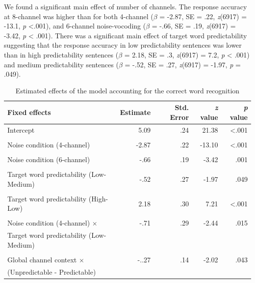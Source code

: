 \documentclass[a4paper, nobind]{templates/ociamthesis}
\begin{document}
We found a significant main effect of number of channels.
The response accuracy at 8-channel was higher than for both 4-channel
(\(\beta\) = -2.87, SE = .22, \emph{z}(6917) = -13.1, \emph{p} \textless.001),
and 6-channel noise-vocoding (\(\beta\) = -.66, SE = .19, \emph{z}(6917) = -3.42, \emph{p} \textless{} .001).
There was a significant main effect of target word predictability suggesting that
the response accuracy in low predictability sentences was lower than in high predictability sentences
(\(\beta\) = 2.18, SE = .3, \emph{z}(6917) = 7.2, \emph{p} \textless{} .001) and medium predictability sentences
(\(\beta\) = -.52, SE = .27, \emph{z}(6917) = -1.97, \emph{p} = .049).

\begin{table}[ht]
\begin{center}
\caption{Estimated effects of the model accounting for the correct word recognition}
\label{results2} 
\vskip 0.12in
\begin{tabular}[]{@{}lrrrr@{}}
\toprule
Fixed effects & Estimate & Std. Error & \emph{z} value & \emph{p}
value \\
\midrule
Intercept & 5.09 & .24 & 21.38 & \textless.001 \\
\\
Noise condition (4-channel) & -2.87 & .22 & -13.10 & \textless.001 \\
\\
Noise condition (6-channel) & -.66 & .19 & -3.42 & .001 \\
\\
Target word predictability (Low-Medium) & -.52 & .27 & -1.97 & .049 \\
\\
Target word predictability (High-Low) & 2.18 & .30 & 7.21 & \textless.001 \\
\\
Noise condition (4-channel) $\times$ & -.71 & .29 & -2.44 & .015 \\
Target word predictability (Low-Medium) \\
\\
Global channel context $\times$ & -..27 & .14 & -2.02 & .043 \\
(Unpredictable - Predictable) \\
\bottomrule
\end{tabular} 
\end{center} 
\end{table}
\end{document}
